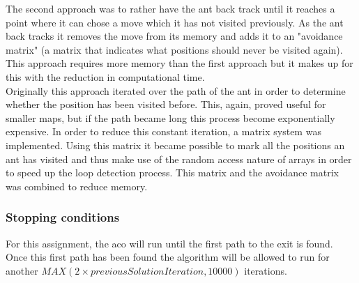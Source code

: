 \documentclass[hidelinks,english,conference]{IEEEtran}
\begin{document}
    The second approach was to rather have the ant back track until it reaches a point where it can chose a move which it has not visited previously. As the ant back tracks it removes the move from its memory and adds it to an "avoidance matrix" (a matrix that indicates what positions should never be visited again). This approach requires more memory than the first approach but it makes up for this with the reduction in computational time.\\
    
    Originally this approach iterated over the path of the ant in order to determine whether the position has been visited before. This, again, proved useful for smaller maps, but if the path became long this process become exponentially expensive. In order to reduce this constant iteration, a matrix system was implemented. Using this matrix it became possible to mark all the positions an ant has visited and thus make use of the random access nature of arrays in order to speed up the loop detection process. This matrix and the avoidance matrix was combined to reduce memory.
    
    \subsubsection{Stopping conditions}
	For this assignment, the \gls{aco} will run until the first path to the exit is found. Once this first path has been found the algorithm will be allowed to run for another $MAX(2\times previousSolutionIteration, 10000)$ iterations.\\
    
\end{document}
